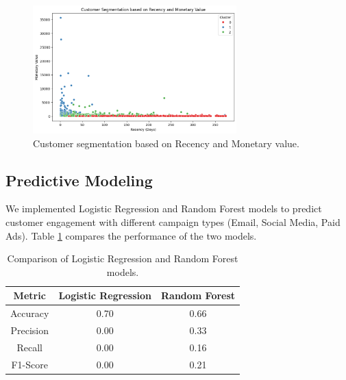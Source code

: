 \documentclass[12pt]{article}
\begin{document}
\begin{figure}[H]
\centering
\includegraphics[width=0.7\textwidth]{customer_segments.png}
\caption{Customer segmentation based on Recency and Monetary value.}
\label{fig:segments}
\end{figure}

\subsection{Predictive Modeling}
We implemented Logistic Regression and Random Forest models to predict customer engagement with different campaign types (Email, Social Media, Paid Ads). Table \ref{tab:model_comparison} compares the performance of the two models.

\begin{table}[H]
\centering
\begin{tabular}{|c|c|c|}
\hline
\textbf{Metric} & \textbf{Logistic Regression} & \textbf{Random Forest} \\ \hline
Accuracy        & 0.70                         & 0.66                   \\ \hline
Precision       & 0.00                         & 0.33                   \\ \hline
Recall          & 0.00                         & 0.16                   \\ \hline
F1-Score        & 0.00                         & 0.21                   \\ \hline
\end{tabular}
\caption{Comparison of Logistic Regression and Random Forest models.}
\label{tab:model_comparison}
\end{table}
\end{document}

